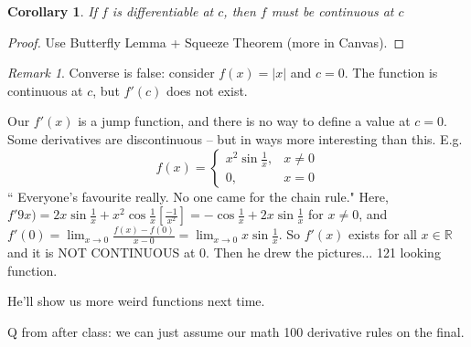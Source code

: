 \documentclass{article}
\theoremstyle{plain}
\newtheorem{corollary}{Corollary}
\theoremstyle{remark}
\newtheorem{remark}{Remark}
\newcommand{\R}{{\mathbb R}}
\begin{document}
\begin{corollary}
	If $f$ is differentiable at $c$, then $f$ must be continuous at $c$
\end{corollary}

\begin{proof}
	Use Butterfly Lemma + Squeeze Theorem (more in Canvas).
\end{proof}

\begin{remark}
	Converse is false: consider $f(x) = |x|$ and $c = 0$.
	The function is continuous at $c$, but $f'(c)$ does not exist.
\end{remark}
Our $f'(x)$ is a jump function, and there is no way to define a value at $c=0$.
Some derivatives are discontinuous -- but in ways more interesting than this. E.g.
\[
	f(x) = \begin{cases}
		x^2 \sin\frac{1}{x}, &x \neq 0\\
		0, &x=0
	\end{cases}
\]
`` Everyone's favourite really.
No one came for the chain rule."
Here, $f'9x) = 2x\sin{\frac{1}{x}} + x^2\cos{\frac{1}{x}} \left[\frac{-1}{x^2}\right]
= - \cos{\frac{1}{x}} + 2x\sin{\frac{1}{x}}$ for $x \neq 0$,
and $f'(0) = \lim_{x\to0} \frac{f(x) - f(0)}{x-0} = \lim_{x \to 0} x \sin{\frac{1}{x}}$.
So $f'(x)$ exists for all $x \in \R$ and it is NOT CONTINUOUS at $0$.
Then he drew the pictures...
121 looking function.

He'll show us more weird functions next time.

Q from after class: we can just assume our math 100 derivative rules on the final.
\end{document}
